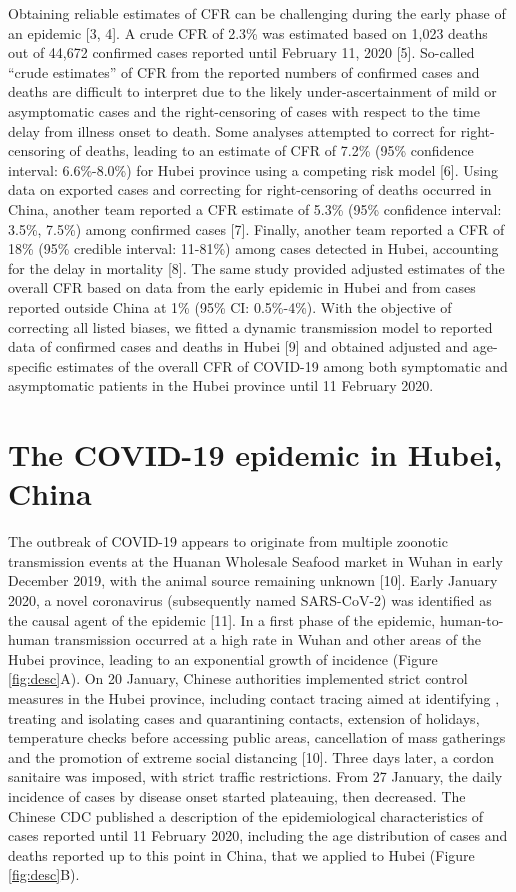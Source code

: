 \documentclass{article}
\begin{document}
Obtaining reliable estimates of CFR can be challenging during the early phase of an epidemic [3, 4]. A crude CFR of 2.3\% was estimated based on 1,023 deaths out of 44,672 confirmed cases reported until February 11, 2020 [5]. So-called “crude estimates” of CFR from the reported numbers of confirmed cases and deaths are difficult to interpret due to the likely under-ascertainment of mild or asymptomatic cases and the right-censoring of cases with respect to the time delay from illness onset to death. Some analyses attempted to correct for right-censoring of deaths, leading to an estimate of CFR of 7.2\% (95\% confidence interval: 6.6\%-8.0\%) for Hubei province using a competing risk model [6]. Using data on exported cases and correcting for right-censoring of deaths occurred in China, another team reported a CFR estimate of 5.3\% (95\% confidence interval: 3.5\%, 7.5\%) among confirmed cases [7]. Finally, another team reported a CFR of 18\% (95\% credible interval: 11-81\%) among cases detected in Hubei, accounting for the delay in mortality [8]. The same study provided adjusted estimates of the overall CFR based on data from the early epidemic in Hubei and from cases reported outside China at 1\% (95\% CI: 0.5\%-4\%). With the objective of correcting all listed biases, we fitted a dynamic transmission model to reported data of confirmed cases and deaths in Hubei [9] and obtained adjusted and age-specific estimates of the overall CFR of COVID-19 among both symptomatic and asymptomatic patients in the Hubei province until 11 February 2020. 

\section*{The COVID-19 epidemic in Hubei, China}

The outbreak of COVID-19 appears to originate from multiple zoonotic transmission events at the Huanan Wholesale Seafood market in Wuhan in early December 2019, with the animal source remaining unknown [10]. Early January 2020, a novel coronavirus (subsequently named SARS-CoV-2) was identified as the causal agent of the epidemic [11]. In a first phase of the epidemic, human-to-human transmission occurred at a high rate in Wuhan and other areas of the Hubei province, leading to an exponential growth of incidence (Figure \ref{fig:desc}A). On 20 January, Chinese authorities implemented strict control measures in the Hubei province, including contact tracing aimed at identifying , treating and isolating cases and quarantining contacts, extension of holidays, temperature checks before accessing public areas, cancellation of mass gatherings and  the promotion of extreme social distancing [10]. Three days later, a cordon sanitaire was imposed, with strict traffic restrictions. From 27 January, the daily incidence of cases by disease onset started plateauing, then decreased. The Chinese CDC published a description of the epidemiological characteristics of cases reported until 11 February 2020, including the age distribution of cases and deaths reported up to this point in China, that we applied to Hubei (Figure \ref{fig:desc}B). 
\end{document}
